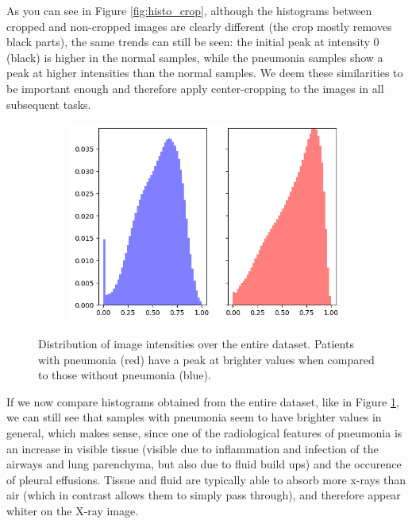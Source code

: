 As you can see in Figure \ref{fig:histo_crop}, although the histograms between cropped and non-cropped images are clearly different (the crop mostly removes black parts), the same trends can still be seen: the initial peak at intensity 0 (black) is higher in the normal samples, while the pneumonia samples show a peak at higher intensities than the normal samples. We deem these similarities to be important enough and therefore apply center-cropping to the images in all subsequent tasks.

\begin{figure}[H]
    \centering
    \begin{subfigure}{0.9\columnwidth}
        \includegraphics[width=1\textwidth]{images/histo.png}
    \end{subfigure}
    \caption{Distribution of image intensities over the entire dataset. Patients with pneumonia (red) have a peak at brighter values when compared to those without pneumonia (blue).}
    \label{fig:histo}
\end{figure}


If we now compare histograms obtained from the entire dataset, like in Figure \ref{fig:histo}, we can still see that samples with pneumonia seem to have brighter values in general, which makes sense, since one of the radiological features of pneumonia is an increase in visible tissue (visible due to inflammation and infection of the airways and lung parenchyma, but also due to fluid build ups) and the occurence of pleural effusions. Tissue and fluid are typically able to absorb more x-rays than air (which in contrast allows them to simply pass through), and therefore appear whiter on the X-ray image.

